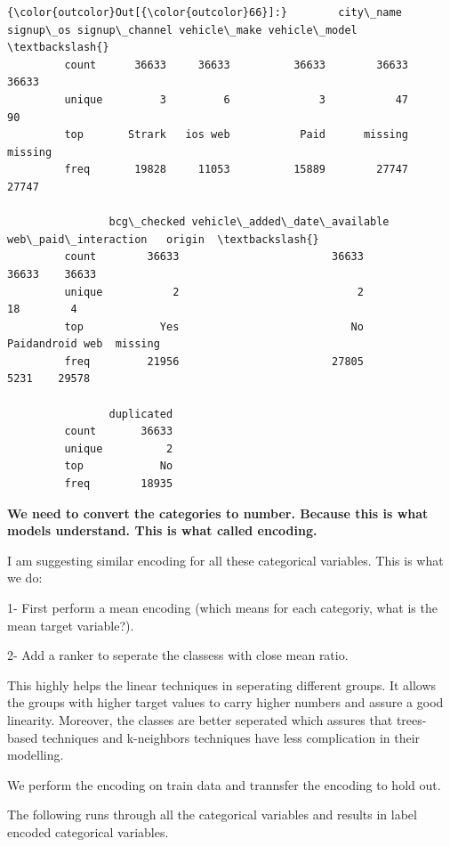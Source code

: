 \documentclass[11pt]{article}
\begin{document}
\begin{Verbatim}[commandchars=\\\{\}]
{\color{outcolor}Out[{\color{outcolor}66}]:}        city\_name signup\_os signup\_channel vehicle\_make vehicle\_model  \textbackslash{}
         count      36633     36633          36633        36633         36633   
         unique         3         6              3           47            90   
         top       Strark   ios web           Paid      missing       missing   
         freq       19828     11053          15889        27747         27747   
         
                bcg\_checked vehicle\_added\_date\_available web\_paid\_interaction   origin  \textbackslash{}
         count        36633                        36633                36633    36633   
         unique           2                            2                   18        4   
         top            Yes                           No      Paidandroid web  missing   
         freq         21956                        27805                 5231    29578   
         
                duplicated  
         count       36633  
         unique          2  
         top            No  
         freq        18935  
\end{Verbatim}
            
    \textbf{We need to convert the categories to number. Because this is
what models understand. This is what called encoding.}

I am suggesting similar encoding for all these categorical variables.
This is what we do:

1- First perform a mean encoding (which means for each categoriy, what
is the mean target variable?).

2- Add a ranker to seperate the classess with close mean ratio.

This highly helps the linear techniques in seperating different groups.
It allows the groups with higher target values to carry higher numbers
and assure a good linearity. Moreover, the classes are better seperated
which assures that trees-based techniques and k-neighbors techniques
have less complication in their modelling.

We perform the encoding on train data and trannsfer the encoding to hold
out.

The following runs through all the categorical variables and results in
label encoded categorical variables.
\end{document}
